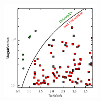 \begin{supplementary}
\begin{figure}[tbp]
  \begin{center}
    \includegraphics[width=0.45\textwidth]{hff_lensed_galaxies}
    \caption{\protect}
  \end{center}
\end{figure}







\end{supplementary}



